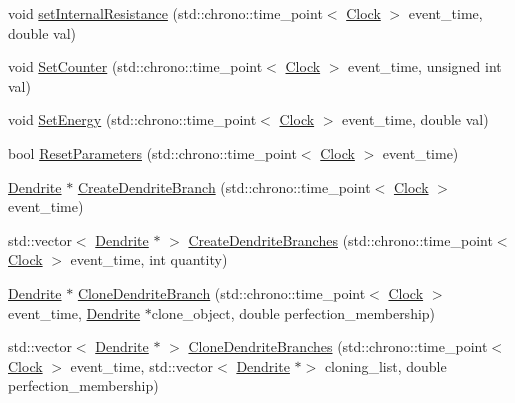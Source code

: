\begin{DoxyCompactItemize}
void \mbox{\hyperlink{classDendrite_ac79018e356cec31be05518b85c73a54d}{set\+Internal\+Resistance}} (std\+::chrono\+::time\+\_\+point$<$ \mbox{\hyperlink{universe_8h_a0ef8d951d1ca5ab3cfaf7ab4c7a6fd80}{Clock}} $>$ event\+\_\+time, double val)
\item 
void \mbox{\hyperlink{classDendrite_a7529495515de74fff2b9a92b12531057}{Set\+Counter}} (std\+::chrono\+::time\+\_\+point$<$ \mbox{\hyperlink{universe_8h_a0ef8d951d1ca5ab3cfaf7ab4c7a6fd80}{Clock}} $>$ event\+\_\+time, unsigned int val)
\item 
void \mbox{\hyperlink{classDendrite_ad341dcd42c9d5d486be1e8268d8bca27}{Set\+Energy}} (std\+::chrono\+::time\+\_\+point$<$ \mbox{\hyperlink{universe_8h_a0ef8d951d1ca5ab3cfaf7ab4c7a6fd80}{Clock}} $>$ event\+\_\+time, double val)
\item 
bool \mbox{\hyperlink{classDendrite_a6a6290955348051819badb801b753901}{Reset\+Parameters}} (std\+::chrono\+::time\+\_\+point$<$ \mbox{\hyperlink{universe_8h_a0ef8d951d1ca5ab3cfaf7ab4c7a6fd80}{Clock}} $>$ event\+\_\+time)
\item 
\mbox{\hyperlink{classDendrite}{Dendrite}} $\ast$ \mbox{\hyperlink{classDendrite_ac7b30397a4753f9c37e96ed716e275eb}{Create\+Dendrite\+Branch}} (std\+::chrono\+::time\+\_\+point$<$ \mbox{\hyperlink{universe_8h_a0ef8d951d1ca5ab3cfaf7ab4c7a6fd80}{Clock}} $>$ event\+\_\+time)
\item 
std\+::vector$<$ \mbox{\hyperlink{classDendrite}{Dendrite}} $\ast$ $>$ \mbox{\hyperlink{classDendrite_a812b9cd99ae7d81023bfa25c8f563e96}{Create\+Dendrite\+Branches}} (std\+::chrono\+::time\+\_\+point$<$ \mbox{\hyperlink{universe_8h_a0ef8d951d1ca5ab3cfaf7ab4c7a6fd80}{Clock}} $>$ event\+\_\+time, int quantity)
\item 
\mbox{\hyperlink{classDendrite}{Dendrite}} $\ast$ \mbox{\hyperlink{classDendrite_ab682ffb9bfd1a1da1623e6b641471068}{Clone\+Dendrite\+Branch}} (std\+::chrono\+::time\+\_\+point$<$ \mbox{\hyperlink{universe_8h_a0ef8d951d1ca5ab3cfaf7ab4c7a6fd80}{Clock}} $>$ event\+\_\+time, \mbox{\hyperlink{classDendrite}{Dendrite}} $\ast$clone\+\_\+object, double perfection\+\_\+membership)
\item 
std\+::vector$<$ \mbox{\hyperlink{classDendrite}{Dendrite}} $\ast$ $>$ \mbox{\hyperlink{classDendrite_abd67c09df69c520e6720bca2592bcc99}{Clone\+Dendrite\+Branches}} (std\+::chrono\+::time\+\_\+point$<$ \mbox{\hyperlink{universe_8h_a0ef8d951d1ca5ab3cfaf7ab4c7a6fd80}{Clock}} $>$ event\+\_\+time, std\+::vector$<$ \mbox{\hyperlink{classDendrite}{Dendrite}} $\ast$$>$ cloning\+\_\+list, double perfection\+\_\+membership)
$$
\end{DoxyCompactItemize}
